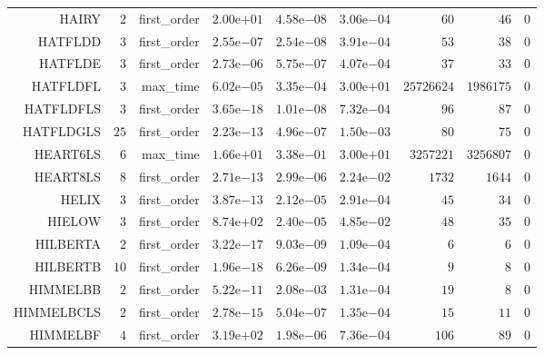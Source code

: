\begin{longtable}{rrrrrrrrr}
HAIRY & \(     2\) & first\_order & \( 2.00\)e\(+01\) & \( 4.58\)e\(-08\) & \( 3.06\)e\(-04\) & \(    60\) & \(    46\) & \(     0\) \\
HATFLDD & \(     3\) & first\_order & \( 2.55\)e\(-07\) & \( 2.54\)e\(-08\) & \( 3.91\)e\(-04\) & \(    53\) & \(    38\) & \(     0\) \\
HATFLDE & \(     3\) & first\_order & \( 2.73\)e\(-06\) & \( 5.75\)e\(-07\) & \( 4.07\)e\(-04\) & \(    37\) & \(    33\) & \(     0\) \\
HATFLDFL & \(     3\) & max\_time & \( 6.02\)e\(-05\) & \( 3.35\)e\(-04\) & \( 3.00\)e\(+01\) & \(25726624\) & \(1986175\) & \(     0\) \\
HATFLDFLS & \(     3\) & first\_order & \( 3.65\)e\(-18\) & \( 1.01\)e\(-08\) & \( 7.32\)e\(-04\) & \(    96\) & \(    87\) & \(     0\) \\
HATFLDGLS & \(    25\) & first\_order & \( 2.23\)e\(-13\) & \( 4.96\)e\(-07\) & \( 1.50\)e\(-03\) & \(    80\) & \(    75\) & \(     0\) \\
HEART6LS & \(     6\) & max\_time & \( 1.66\)e\(+01\) & \( 3.38\)e\(-01\) & \( 3.00\)e\(+01\) & \(3257221\) & \(3256807\) & \(     0\) \\
HEART8LS & \(     8\) & first\_order & \( 2.71\)e\(-13\) & \( 2.99\)e\(-06\) & \( 2.24\)e\(-02\) & \(  1732\) & \(  1644\) & \(     0\) \\
HELIX & \(     3\) & first\_order & \( 3.87\)e\(-13\) & \( 2.12\)e\(-05\) & \( 2.91\)e\(-04\) & \(    45\) & \(    34\) & \(     0\) \\
HIELOW & \(     3\) & first\_order & \( 8.74\)e\(+02\) & \( 2.40\)e\(-05\) & \( 4.85\)e\(-02\) & \(    48\) & \(    35\) & \(     0\) \\
HILBERTA & \(     2\) & first\_order & \( 3.22\)e\(-17\) & \( 9.03\)e\(-09\) & \( 1.09\)e\(-04\) & \(     6\) & \(     6\) & \(     0\) \\
HILBERTB & \(    10\) & first\_order & \( 1.96\)e\(-18\) & \( 6.26\)e\(-09\) & \( 1.34\)e\(-04\) & \(     9\) & \(     8\) & \(     0\) \\
HIMMELBB & \(     2\) & first\_order & \( 5.22\)e\(-11\) & \( 2.08\)e\(-03\) & \( 1.31\)e\(-04\) & \(    19\) & \(     8\) & \(     0\) \\
HIMMELBCLS & \(     2\) & first\_order & \( 2.78\)e\(-15\) & \( 5.04\)e\(-07\) & \( 1.35\)e\(-04\) & \(    15\) & \(    11\) & \(     0\) \\
HIMMELBF & \(     4\) & first\_order & \( 3.19\)e\(+02\) & \( 1.98\)e\(-06\) & \( 7.36\)e\(-04\) & \(   106\) & \(    89\) & \(     0\) \\

\end{longtable}
